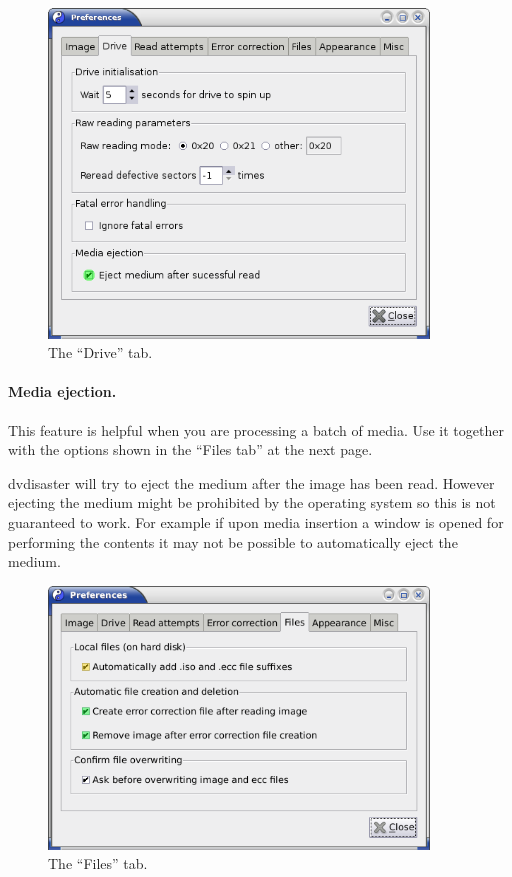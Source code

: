 \newpage

\begin{figure}[h]
\centerline{\includegraphics[width=0.9\textwidth]{screenshots/eccfile-prefs-drive-adv.png}}
\caption{The ``Drive'' tab.}  
\label{howto-eccfile-prefs-drive-adv}
\end{figure}

\paragraph{Media ejection.} This feature is helpful
when you are processing a batch of media. Use it together with the
options shown in the ``Files tab'' at the next page.

\smallskip

dvdisaster will try to eject the medium after the image has
been read. However ejecting the medium might be prohibited by
the operating system so this is not guaranteed to work. For example if upon
media insertion a window is opened for performing the contents it may not be possible to
automatically eject the medium.

\newpage

\begin{figure}[h]
\centerline{\includegraphics[width=0.9\textwidth]{screenshots/eccfile-prefs-file-adv.png}}
\caption{The ``Files'' tab.}  
\label{howto-eccfile-prefs-file-adv}
\end{figure}

